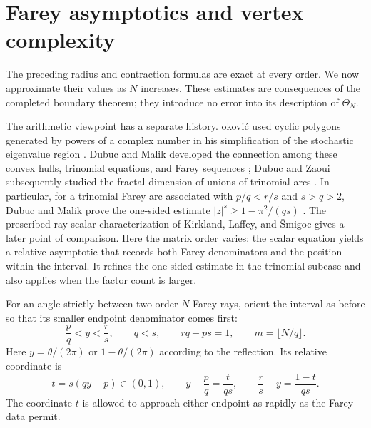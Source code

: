 \documentclass[11pt,a4paper]{article}
\theoremstyle{definition}
\theoremstyle{remark}
\numberwithin{equation}{section}
\begin{document}
\section{Farey asymptotics and vertex complexity}
\label{sec:asymptotic}

The preceding radius and contraction formulas are exact at every order.
We now approximate their values as $N$ increases.  These estimates are
consequences of the completed boundary theorem; they introduce no error
into its description of $\Theta_N$.

The arithmetic viewpoint has a separate history. \DJ okovi\'c used
cyclic polygons generated by powers of a complex number in his
simplification of the stochastic eigenvalue region \cite{Djokovic}.
Dubuc and Malik developed the connection among these convex hulls,
trinomial equations, and Farey sequences \cite{DubucMalik}; Dubuc and
Zaoui subsequently studied the fractal dimension of unions of trinomial
arcs \cite{DubucZaoui}. In particular, for a trinomial Farey arc
associated with $p/q<r/s$ and $s>q>2$, Dubuc and Malik prove the
one-sided estimate $|z|^s\ge1-\pi^2/(qs)$
\cite[Theorem~13.1]{DubucMalik}.
The prescribed-ray scalar characterization of Kirkland, Laffey, and
\v{S}migoc \cite{KirklandLaffeySmigoc} gives a later point of comparison.
Here the matrix order varies: the scalar equation yields a relative
asymptotic that records both Farey denominators and the position within
the interval. It refines the one-sided estimate in the trinomial
subcase and also applies when the factor count is larger.

For an angle strictly between two order-$N$ Farey rays, orient the
interval as before so that its smaller endpoint denominator comes first:
\[
 \frac pq<y<\frac rs,\qquad q<s,\qquad rq-ps=1,
 \qquad m=\lfloor N/q\rfloor.
\]
Here $y=\theta/(2\pi)$ or $1-\theta/(2\pi)$ according to the reflection.
Its relative coordinate is
\[
 t=s(qy-p)\in(0,1),\qquad
 y-\frac pq=\frac{t}{qs},\qquad
 \frac rs-y=\frac{1-t}{qs}.
\]
The coordinate $t$ is allowed to approach either endpoint as rapidly as
the Farey data permit.
\end{document}
